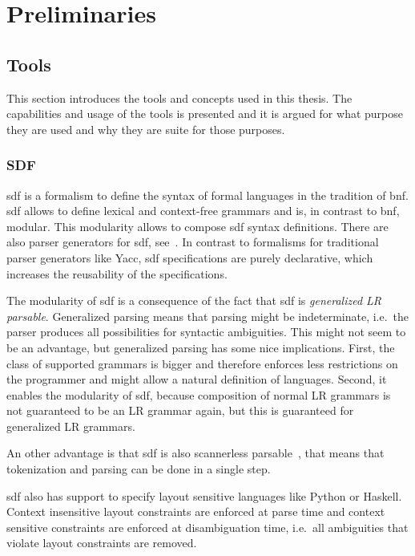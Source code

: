 
\chapter{Preliminaries}
\section{Tools}
This section introduces the tools and concepts used in this
thesis. The capabilities and usage of the tools is presented and it is
argued for what purpose they are used and why they are suite for those
purposes.
\subsection{SDF}
\gls{sdf} is a formalism to define the syntax of formal languages in
the tradition of \gls{bnf}. \gls{sdf} allows to define lexical and
context-free grammars and is, in contrast to \gls{bnf}, modular. This
modularity allows to compose \gls{sdf} syntax definitions. There are
also parser generators for \gls{sdf},
see~\cite{Rekers92parsergeneration}. In contrast to formalisms for
traditional parser generators like Yacc\cite{Johnson75yacc:yet},
\gls{sdf} specifications are purely declarative, which increases the
reusability of the specifications.

The modularity of \gls{sdf} is a consequence of the fact that
\gls{sdf} is \textit{generalized LR
  parsable}\cite{Rekers92parsergeneration}. Generalized parsing means
that parsing might be indeterminate, i.e.\ the parser produces all
possibilities for syntactic ambiguities. This might not seem to be an
advantage, but generalized parsing has some nice implications. First,
the class of supported grammars is bigger and therefore enforces less
restrictions on the programmer and might allow a natural definition of
languages. Second, it enables the modularity of \gls{sdf}, because
composition of normal LR grammars is not guaranteed to be an LR
grammar again, but this is guaranteed for generalized LR grammars.

An other advantage is that \gls{sdf} is also scannerless
parsable~\cite{Brand02disambiguationfilters}, that means that
tokenization and parsing can be done in a single step.

\gls{sdf} also has support to specify layout sensitive
languages\cite{conf/sle/ErdwegRKO12} like Python or Haskell. Context
insensitive layout constraints are enforced at parse time and context
sensitive constraints are enforced at disambiguation time, i.e.\ all
ambiguities that violate layout constraints are removed.

